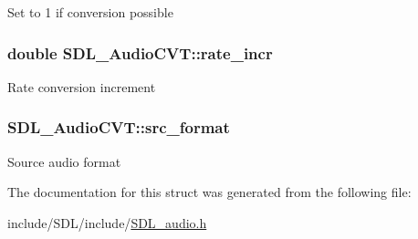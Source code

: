 Set to 1 if conversion possible \hypertarget{struct_s_d_l___audio_c_v_t_ad886122c23a6673073baace31bff3b6c}{
\subsubsection[{rate\-\_\-incr}]{\setlength{\rightskip}{0pt plus 5cm}double S\-D\-L\-\_\-\-Audio\-C\-V\-T\-::rate\-\_\-incr}}\label{struct_s_d_l___audio_c_v_t_ad886122c23a6673073baace31bff3b6c}
Rate conversion increment \hypertarget{struct_s_d_l___audio_c_v_t_a6ae81231e017105e6d5e745a51732e16}{
\subsubsection[{src\-\_\-format}]{ S\-D\-L\-\_\-\-Audio\-C\-V\-T\-::src\-\_\-format}}\label{struct_s_d_l___audio_c_v_t_a6ae81231e017105e6d5e745a51732e16}
Source audio format 

The documentation for this struct was generated from the following file\-:\begin{DoxyCompactItemize}
\item 
include/\-S\-D\-L/include/\hyperlink{_s_d_l__audio_8h}{S\-D\-L\-\_\-audio.\-h}\end{DoxyCompactItemize}
